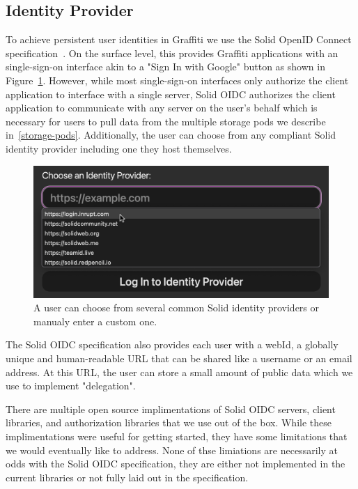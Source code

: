 \usepackage{cleveref}
\subsection{Identity Provider}
\label{identity-provider}

To achieve persistent user identities in Graffiti
we use the Solid OpenID Connect specification~\cite{solid-oidc}.
On the surface level, this provides Graffiti applications
with an single-sign-on interface akin to a "Sign In with Google" button
as shown in Figure~\ref{fig:solid-oidc}.
However, while most single-sign-on interfaces only authorize
the client application to interface with a single server,
Solid OIDC authorizes the client application
to communicate with any server on the user's behalf which
is necessary for users to pull data from the multiple storage pods
we describe in~\cref{storage-pods}.
Additionally, the user can choose from any compliant
Solid identity provider including one they host themselves.

\begin{figure}
\label{fig:solid-oidc}
\includegraphics{paper/system/solid-oidc.png}
\caption{A user can choose from several common Solid identity providers
or manualy enter a custom one.}
\end{figure}

The Solid OIDC specification also provides
each user with a webId, a globally unique and human-readable URL
that can be shared like a username or an email address.
At this URL, the user can store a small amount of public data
which we use to implement "delegation".

There are multiple open source implimentations of Solid OIDC servers,
client libraries, and authorization libraries that we use out of the box.
While these implimentations were useful for getting started,
they have some limitations that we would eventually like to address.
None of thse limiations are necessarily at odds with the Solid OIDC
specification, they are either not implemented in the current libraries
or not fully laid out in the specification.


